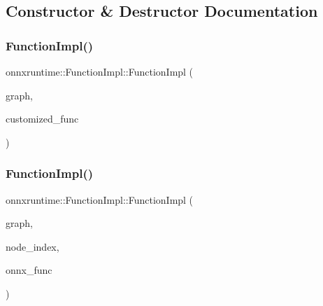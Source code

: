\subsection{Constructor \& Destructor Documentation}
\mbox{\label{classonnxruntime_1_1FunctionImpl_a897e215474de502ee1cd211563b7ddea}} 
\subsubsection{\texorpdfstring{Function\+Impl()}{FunctionImpl()}\hspace{0.1cm}{\footnotesize\ttfamily [1/2]}}
{\footnotesize\ttfamily onnxruntime\+::\+Function\+Impl\+::\+Function\+Impl (\begin{DoxyParamCaption}\item[{const \mbox{\hyperlink{classonnxruntime_1_1Graph}{onnxruntime\+::\+Graph}} \&}]{graph,  }\item[{std\+::unique\+\_\+ptr$<$ \mbox{\hyperlink{structonnxruntime_1_1IndexedSubGraph}{Indexed\+Sub\+Graph}} $>$}]{customized\+\_\+func }\end{DoxyParamCaption})}

\mbox{\label{classonnxruntime_1_1FunctionImpl_ae08b81d4d3b431fd36ff839ca6c94bbc}} 
\subsubsection{\texorpdfstring{Function\+Impl()}{FunctionImpl()}\hspace{0.1cm}{\footnotesize\ttfamily [2/2]}}
{\footnotesize\ttfamily onnxruntime\+::\+Function\+Impl\+::\+Function\+Impl (\begin{DoxyParamCaption}\item[{const \mbox{\hyperlink{classonnxruntime_1_1Graph}{onnxruntime\+::\+Graph}} \&}]{graph,  }\item[{const \mbox{\hyperlink{namespaceonnxruntime_af8773b5c12b5d8fd9292eb2e268df760}{onnxruntime\+::\+Node\+Index}} \&}]{node\+\_\+index,  }\item[{const O\+N\+N\+X\+\_\+\+N\+A\+M\+E\+S\+P\+A\+C\+E\+::\+Function\+Proto $\ast$}]{onnx\+\_\+func }\end{DoxyParamCaption})}


